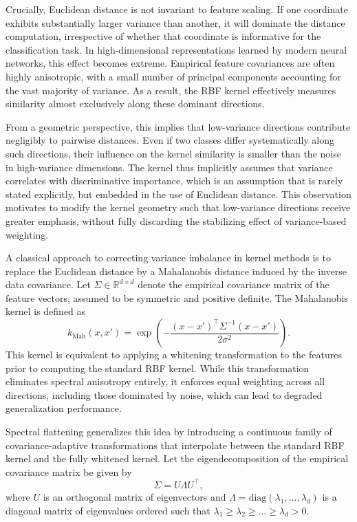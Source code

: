 \documentclass{article}
\begin{document}
Crucially, Euclidean distance is not invariant to feature scaling. If one coordinate exhibits substantially larger variance than another, it will dominate the distance computation, irrespective of whether that coordinate is informative for the classification task. In high-dimensional representations learned by modern neural networks, this effect becomes extreme. Empirical feature covariances are often highly anisotropic, with a small number of principal components accounting for the vast majority of variance. As a result, the RBF kernel effectively measures similarity almost exclusively along these dominant directions.

From a geometric perspective, this implies that low-variance directions contribute negligibly to pairwise distances. Even if two classes differ systematically along such directions, their influence on the kernel similarity is smaller than the noise in high-variance dimensions. The kernel thus implicitly assumes that variance correlates with discriminative importance, which is an assumption that is rarely stated explicitly, but embedded in the use of Euclidean distance. This observation motivates to modify the kernel geometry such that low-variance directions receive greater emphasis, without fully discarding the stabilizing effect of variance-based weighting.

A classical approach to correcting variance imbalance in kernel methods is to replace the Euclidean distance by a Mahalanobis distance induced by the inverse data covariance. Let $\Sigma \in \mathbb{R}^{d \times d}$ denote the empirical covariance matrix of the feature vectors, assumed to be symmetric and positive definite. The Mahalanobis kernel is defined as
\[
k_{\text{Mah}}(x, x') 
= \exp\left(
    -\frac{(x - x')^\top \Sigma^{-1} (x - x')}{2\sigma^2}
\right).
\]
This kernel is equivalent to applying a whitening transformation to the features prior to computing the standard RBF kernel. While this transformation eliminates spectral anisotropy entirely, it enforces equal weighting across all directions, including those dominated by noise, which can lead to degraded generalization performance.

Spectral flattening generalizes this idea by introducing a continuous family of covariance-adaptive transformations that interpolate between the standard RBF kernel and the fully whitened kernel. Let the eigendecomposition of the empirical covariance matrix be given by
\[
\Sigma = U \Lambda U^\top,
\]
where $U$ is an orthogonal matrix of eigenvectors and $\Lambda = \mathrm{diag}(\lambda_1, \ldots, \lambda_d)$ is a diagonal matrix of eigenvalues ordered such that $\lambda_1 \geq \lambda_2 \geq \dots \geq \lambda_d > 0$.
\end{document}
